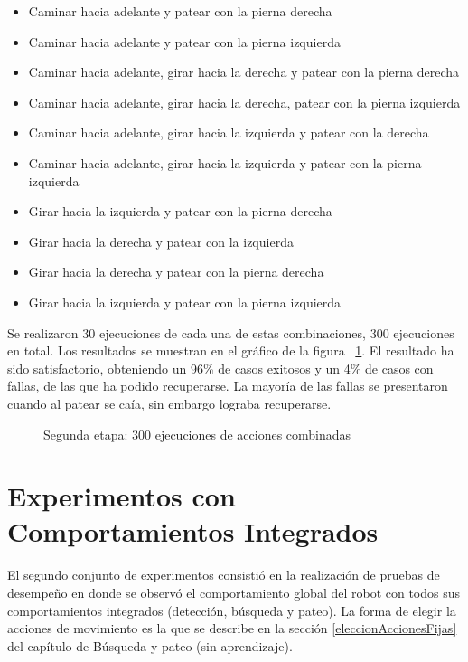 \begin{itemize}
\setlength{\itemsep}{1pt}
\item Caminar hacia adelante y patear con la pierna derecha 
\item Caminar hacia adelante y patear con la pierna izquierda
\item Caminar hacia adelante, girar hacia la derecha y patear con la pierna derecha
\item Caminar hacia adelante, girar hacia la derecha, patear con la pierna izquierda 
\item Caminar hacia adelante, girar hacia la izquierda y patear con la derecha
\item Caminar hacia adelante, girar hacia la  izquierda y  patear con la pierna izquierda
\item Girar hacia la izquierda y patear con la pierna derecha
\item Girar hacia la derecha y patear con la izquierda
\item Girar hacia la derecha y patear con la pierna derecha
\item Girar hacia la izquierda y patear con la pierna izquierda
 \end{itemize}

Se realizaron 30 ejecuciones de cada una de estas combinaciones, 300 ejecuciones en total. Los resultados se muestran en el gráfico de la figura ~\ref{fig:etp2}. El resultado ha sido satisfactorio, obteniendo un 96\% de casos exitosos y un 4\% de casos con fallas, de las que ha podido recuperarse. La mayoría de las fallas se presentaron cuando al patear se caía, sin embargo lograba recuperarse.  

\begin{figure}[th!]
\caption{Segunda etapa: 300 ejecuciones de acciones combinadas}
\label{fig:etp2}
\end{figure}

\section{Experimentos con Comportamientos Integrados}
\label{sec:experimentosintegrados}

El segundo conjunto de experimentos consistió en la realización de pruebas de desempeño en donde se observó el comportamiento global del robot con todos sus comportamientos integrados (detección, búsqueda y pateo). La forma de elegir la acciones de movimiento es la que se describe en la sección \ref{eleccionAccionesFijas} del cap\'itulo de Búsqueda y pateo (sin aprendizaje). 

